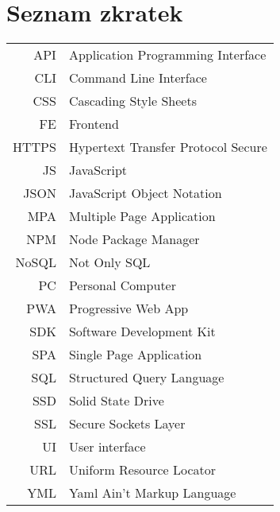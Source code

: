 
\chapter{Seznam zkratek}

\begin{tabular}{rl}
    API     & Application Programming Interface \\
    CLI     & Command Line Interface \\
    CSS     & Cascading Style Sheets \\
    FE      & Frontend \\
    HTTPS   & Hypertext Transfer Protocol Secure \\
    JS      & JavaScript \\
    JSON    & JavaScript Object Notation \\
    MPA     & Multiple Page Application \\
    NPM     & Node Package Manager \\
    NoSQL   & Not Only SQL \\
    PC      & Personal Computer \\
    PWA     & Progressive Web App \\
    SDK     & Software Development Kit \\
    SPA     & Single Page Application \\
    SQL     & Structured Query Language \\
    SSD     & Solid State Drive \\
    SSL     & Secure Sockets Layer \\
    UI      & User interface \\
    URL     & Uniform Resource Locator \\
    YML     & Yaml Ain't Markup Language \\
\end{tabular}
